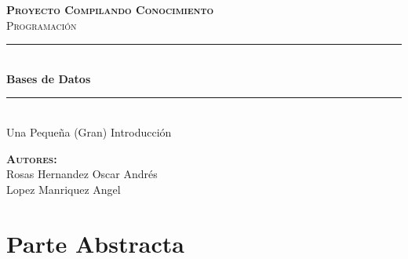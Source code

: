 \documentclass[12pt, fleqn]{report}                             %
\author{Oscar Andrés Rosas}                                     %
\begin{document}
\begin{titlepage}

    \center
    \textbf{\textsc{\Large Proyecto Compilando Conocimiento}}\\[1.0cm] 
    \textsc{\Large Programación}\\[1.0cm] 

    \rule{\linewidth}{0.5mm} \\[1.0cm]
        { \huge \bfseries Bases de Datos}\\[1.0cm] 
    \rule{\linewidth}{0.5mm} \\[2.0cm]
    
    {\LARGE Una Pequeña (Gran) Introducción}\\[7cm] 
    
    \begin{center} \large
    \textbf{\textsc{Autores:}}\\
        Rosas Hernandez Oscar Andrés \\
        Lopez Manriquez Angel
    \end{center}

    \vfill

\end{titlepage}

\tableofcontents{}
\label{sec:Index}

\clearpage




\part{Parte Abstracta}
\clearpage


\end{document}
